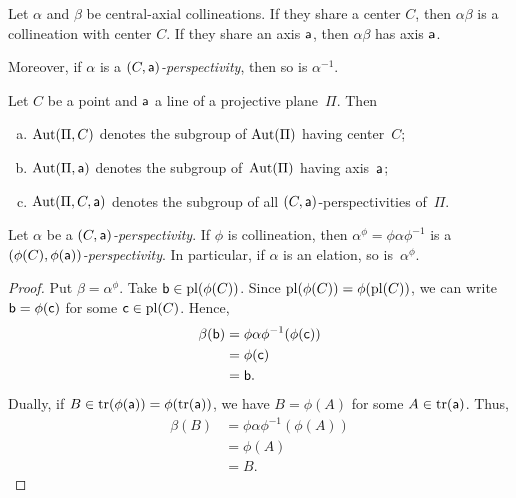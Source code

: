 \begin{rem}\label{rem:perspectivity-groups}
    Let\/ $\alpha$ and\/ $\beta$ be central-axial collineations. If they share a center\/ $C$, then\/ $\alpha\beta$ is a collineation with center\/ $C$. If they share an axis\/ $\mathsf a$, then\/ $\alpha\beta$ has axis\/ $\mathsf a$.

    Moreover, if\/ $\alpha$ is a \textsl{$(C,\mathsf a)$-perspectivity}, then so is\/ $\alpha^{-1}$.
\end{rem}

\begin{ntn}
    Let\/ $C$ be a point and\/ $\mathsf a$ a line of a projective plane\/~$\Pi$. Then
    \begin{enumerate}[a),font=\upshape]
        \item $\operatorname{Aut}(\Pi, C)$ denotes the subgroup of\/ $\operatorname{Aut}(\Pi)$ having center\/~$C$;
        \item $\operatorname{Aut}(\Pi, \mathsf a)$ denotes the subgroup of\/~$\operatorname{Aut}(\Pi)$ having axis\/~$\mathsf a$;
        \item $\operatorname{Aut}(\Pi, C, \mathsf a)$ denotes the subgroup of all $(C, \mathsf a)$-perspectivities of\/~$\Pi$.
    \end{enumerate}
\end{ntn}

\begin{prop}\label{prop:perspectivity-conjugation}
    Let\/ $\alpha$ be a \textsl{$(C, \mathsf a)$-perspectivity}. If\/ $\phi$ is collineation, then\/ $\alpha^\phi=\phi\alpha\phi^{-1}$ is a \textsl{$(\phi(C), \phi(\mathsf a))$-perspectivity}. In particular, if\/ $\alpha$ is an elation, so is\/~$\alpha^\phi$.
\end{prop}

\begin{proof}
    Put $\beta=\alpha^\phi$. Take $\mathsf b\in\operatorname{pl}(\phi(C))$. Since $\operatorname{pl}(\phi(C))=\phi(\operatorname{pl}(C))$, we can write $\mathsf b=\phi(\mathsf c)$ for some $\mathsf c\in\operatorname{pl}(C)$. Hence,
    \begin{align*}
        \beta(\mathsf b) &= \phi\alpha\phi^{-1}(\phi(\mathsf c))\\
            &= \phi(\mathsf c)\\
            &= \mathsf b.
    \end{align*}
    Dually, if $B\in\operatorname{tr}(\phi(\mathsf a))=\phi(\operatorname{tr}(\mathsf a))$, we have $B=\phi(A)$ for some $A\in\operatorname{tr}(\mathsf a)$. Thus,
    \begin{align*}
        \beta(B) &= \phi\alpha\phi^{-1}(\phi(A))\\
            &= \phi(A)\\
            &= B.
    \end{align*}
\end{proof}

